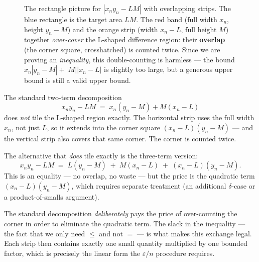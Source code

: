 \begin{figure}[h]
\caption{%
The rectangle picture for $|x_n y_n - LM|$ with overlapping strips.
The \textcolor{blue!70}{blue} rectangle is the target area $LM$.
The \textcolor{red!60}{red} band (full width $x_n$, height $y_n - M$)
and the \textcolor{orange!70}{orange} strip (width $x_n - L$, full height $M$)
together \emph{over-cover} the L-shaped difference region: their
\textbf{overlap} (the corner square, crosshatched) is counted twice.
Since we are proving an \emph{inequality}, this double-counting is
harmless — the bound $x_n|y_n-M| + |M||x_n-L|$ is slightly too large,
but a generous upper bound is still a valid upper bound.}
\end{figure}

\begin{remark*}
The standard two-term decomposition
\[
  x_n y_n - LM \;=\; x_n(y_n-M) + M(x_n-L)
\]
does \emph{not} tile the L-shaped region exactly.
The horizontal strip uses the full width $x_n$, not just $L$,
so it extends into the corner square $(x_n - L)(y_n-M)$ — and the
vertical strip also covers that same corner.
The corner is counted twice.

The alternative that \emph{does} tile exactly is the three-term version:
\[
  x_n y_n - LM \;=\; L(y_n-M) \;+\; M(x_n-L) \;+\; (x_n-L)(y_n-M).
\]
This is an equality — no overlap, no waste — but the price is the
quadratic term $(x_n-L)(y_n-M)$, which requires separate treatment
(an additional $\delta$-case or a product-of-smalls argument).

The standard decomposition \emph{deliberately} pays the price of
over-counting the corner in order to eliminate the quadratic term.
The slack in the inequality — the fact that we only need
$\le$ and not $=$ — is what makes this exchange legal.
Each strip then contains exactly one small quantity multiplied by one
bounded factor, which is precisely the linear form the
$\varepsilon/n$ procedure requires.
\end{remark*}

